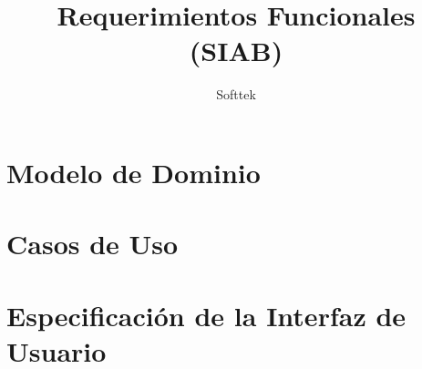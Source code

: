 \documentclass[10pt, letterpaper]{report}
\begin{document}
\title{Requerimientos Funcionales (SIAB)}
\author{Softtek}
\date{}




\pagestyle{plain}
\tableofcontents

\pagestyle{fancy}
\fancyhf{}
\fancyhead[OC]{\leftmark}
\fancyhead[EC]{\rightmark}
\cfoot{\thepage}

\chapter{Modelo de Dominio}
\clearpage


\chapter{Casos de Uso}
\clearpage


\chapter{Especificación de la Interfaz de Usuario}
\clearpage


\printglossary
\end{document}

